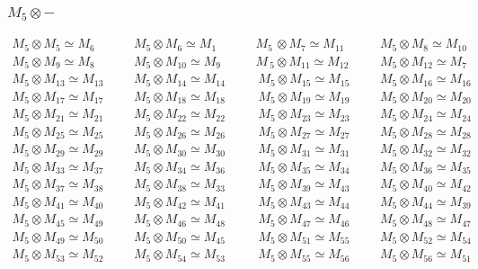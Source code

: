 \subsubsection{$M_5\otimes -$}
\begin{align*}
M_{5} \otimes M_{5} \simeq M_{6} &&& M_{5} \otimes M_{6} \simeq M_{1} &&& M_{5\
} \otimes M_{7} \simeq M_{11} &&& M_{5} \otimes M_{8} \simeq M_{10}\\
M_{5} \otimes M_{9} \simeq M_{8} &&& M_{5} \otimes M_{10} \simeq M_{9} &&& M_{\
5} \otimes M_{11} \simeq M_{12} &&& M_{5} \otimes M_{12} \simeq M_{7}\\
M_{5} \otimes M_{13} \simeq M_{13} &&& M_{5} \otimes M_{14} \simeq M_{14} &&& \
M_{5} \otimes M_{15} \simeq M_{15} &&& M_{5} \otimes M_{16} \simeq M_{16}\\
M_{5} \otimes M_{17} \simeq M_{17} &&& M_{5} \otimes M_{18} \simeq M_{18} &&& \
M_{5} \otimes M_{19} \simeq M_{19} &&& M_{5} \otimes M_{20} \simeq M_{20}\\
M_{5} \otimes M_{21} \simeq M_{21} &&& M_{5} \otimes M_{22} \simeq M_{22} &&& \
M_{5} \otimes M_{23} \simeq M_{23} &&& M_{5} \otimes M_{24} \simeq M_{24}\\
M_{5} \otimes M_{25} \simeq M_{25} &&& M_{5} \otimes M_{26} \simeq M_{26} &&& \
M_{5} \otimes M_{27} \simeq M_{27} &&& M_{5} \otimes M_{28} \simeq M_{28}\\
M_{5} \otimes M_{29} \simeq M_{29} &&& M_{5} \otimes M_{30} \simeq M_{30} &&& \
M_{5} \otimes M_{31} \simeq M_{31} &&& M_{5} \otimes M_{32} \simeq M_{32}\\
M_{5} \otimes M_{33} \simeq M_{37} &&& M_{5} \otimes M_{34} \simeq M_{36} &&& \
M_{5} \otimes M_{35} \simeq M_{34} &&& M_{5} \otimes M_{36} \simeq M_{35}\\
M_{5} \otimes M_{37} \simeq M_{38} &&& M_{5} \otimes M_{38} \simeq M_{33} &&& \
M_{5} \otimes M_{39} \simeq M_{43} &&& M_{5} \otimes M_{40} \simeq M_{42}\\
M_{5} \otimes M_{41} \simeq M_{40} &&& M_{5} \otimes M_{42} \simeq M_{41} &&& \
M_{5} \otimes M_{43} \simeq M_{44} &&& M_{5} \otimes M_{44} \simeq M_{39}\\
M_{5} \otimes M_{45} \simeq M_{49} &&& M_{5} \otimes M_{46} \simeq M_{48} &&& \
M_{5} \otimes M_{47} \simeq M_{46} &&& M_{5} \otimes M_{48} \simeq M_{47}\\
M_{5} \otimes M_{49} \simeq M_{50} &&& M_{5} \otimes M_{50} \simeq M_{45} &&& \
M_{5} \otimes M_{51} \simeq M_{55} &&& M_{5} \otimes M_{52} \simeq M_{54}\\
M_{5} \otimes M_{53} \simeq M_{52} &&& M_{5} \otimes M_{54} \simeq M_{53} &&& \
M_{5} \otimes M_{55} \simeq M_{56} &&& M_{5} \otimes M_{56} \simeq M_{51}\\
\end{align*}

